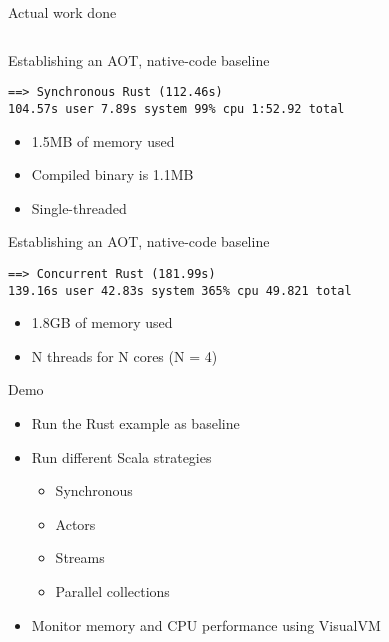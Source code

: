 \documentclass[aspectratio=169,14pt]{beamer}
\newcommand{\megatext}[1]{
  \begin{center}
    \Huge
    #1
  \end{center}
}
\begin{document}
\begin{frame}[fragile]{Actual work done}
  \inputminted{rust}{snippets/handle_line.rs}
\end{frame}


\begin{frame}[fragile]{Establishing an AOT, native-code baseline}
  \begin{verbatim}
==> Synchronous Rust (112.46s)
104.57s user 7.89s system 99% cpu 1:52.92 total
    \end{verbatim}

    \begin{itemize}
      \item 1.5MB of memory used
      \item Compiled binary is 1.1MB
      \item Single-threaded
    \end{itemize}
\end{frame}


\begin{frame}[fragile]{Establishing an AOT, native-code baseline}
  \begin{verbatim}
==> Concurrent Rust (181.99s)
139.16s user 42.83s system 365% cpu 49.821 total
  \end{verbatim}

  \begin{itemize}
    \item 1.8GB of memory used
    \item N threads for N cores (N = 4)
  \end{itemize}
\end{frame}


\begin{frame}
  \megatext{Demo}

  \begin{itemize}
  \item Run the Rust example as baseline
  \item Run different Scala strategies
    \begin{itemize}
    \item Synchronous
    \item Actors
    \item Streams
    \item Parallel collections
    \end{itemize}
  \item Monitor memory and CPU performance using VisualVM
  \end{itemize}
\end{frame}
\end{document}
